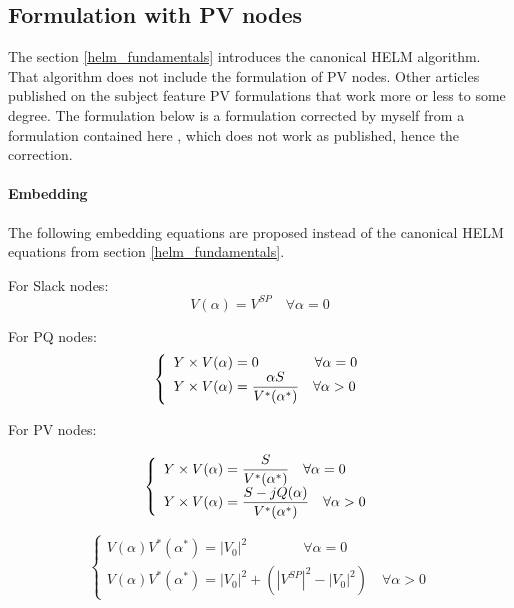 \documentclass[nols,a4paper,twoside,notoc,fleqn]{tufte-book}
\begin{document}
\subsection{Formulation with PV nodes}

The section \ref{helm_fundamentals} introduces the canonical HELM algorithm. That algorithm does not include the formulation of PV nodes.
Other articles published on the subject feature PV formulations that work more or less to some degree. The formulation below is a formulation corrected by myself from a formulation contained here \cite{liu2017online}, which does not work as published, hence the correction.



\paragraph{Embedding}

The following embedding equations are proposed instead of the canonical HELM equations from section \ref{helm_fundamentals}.

For Slack nodes:
\begin{equation}
V(\alpha) = V^{SP} \quad \forall \alpha=0
\end{equation}

For PQ nodes:
\begin{equation}
\left\{
\begin{array}{ll}
{Y} \times {V}(\alpha) = 0 \quad \quad \quad \quad \forall \alpha=0\\
\mathlarger{{Y} \times {V}(\alpha) = \frac{\alpha {S}}{{V}^*(\alpha^*)}} \quad \forall \alpha>0
\end{array}
\right.
\end{equation}

For PV nodes:

\begin{equation}
\left\{
\begin{array}{ll}
\mathlarger{{Y} \times {V}(\alpha) = \frac{ {S}}{{V}^*(\alpha^*)}} \quad \forall \alpha=0\\
\mathlarger{{Y} \times {V}(\alpha) = \frac{ {S} - j {Q}(\alpha)}{{V}^*(\alpha^*)}} \quad \forall \alpha>0
\end{array}
\right.
\end{equation}

\begin{equation}
\left\{
\begin{array}{ll}
V(\alpha)V^*(\alpha^*) = |V_0|^2\quad \quad \quad \quad \forall \alpha=0\\
V(\alpha)V^*(\alpha^*) = |V_0|^2 + (|V^{SP}|^2-|V_0|^2) \quad \forall \alpha>0
\end{array}
\right.
\end{equation}
\end{document}
